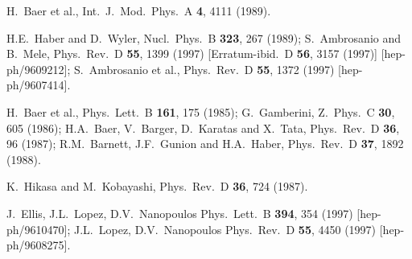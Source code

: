 \documentclass[11pt]{article}
\def\stilde{\widetilde}
\def\NI{\stilde N_1}
\begin{document}
\begin{thebibliography}{999}
H.~Baer et al., 
  Int.\ J.\ Mod.\ Phys.\ A {\bf 4}, 4111 (1989).

H.E.~Haber and D.~Wyler, 
  Nucl.\ Phys.\ B {\bf 323}, 267 (1989);
S.~Ambrosanio and B.~Mele, 
  Phys.\ Rev.\ D {\bf 55}, 1399 (1997)
  [Erratum-ibid.\ D {\bf 56}, 3157 (1997)]
  [hep-ph/9609212];
S.~Ambrosanio et al., 
  Phys.\ Rev.\ D {\bf 55}, 1372 (1997)
  [hep-ph/9607414].

H.~Baer et al., 
  Phys.\ Lett.\ B {\bf 161}, 175 (1985);
G.~Gamberini, 
  Z.\ Phys.\ C {\bf 30}, 605 (1986);
H.A.~Baer, V.~Barger, D.~Karatas and X.~Tata,
  Phys.\ Rev.\ D {\bf 36}, 96 (1987);
R.M.~Barnett, J.F.~Gunion and H.A.~Haber, 
  Phys.\ Rev.\ D {\bf 37}, 1892 (1988).

K.~Hikasa and M.~Kobayashi,
  Phys.\ Rev.\ D {\bf 36}, 724 (1987).

J.~Ellis, J.L.~Lopez, D.V.~Nanopoulos 
  Phys.\ Lett.\ B {\bf 394}, 354 (1997)
  [hep-ph/9610470];
J.L.~Lopez, D.V.~Nanopoulos 
  Phys.\ Rev.\ D {\bf 55}, 4450 (1997)
  [hep-ph/9608275].


\end{thebibliography}
\end{document}
